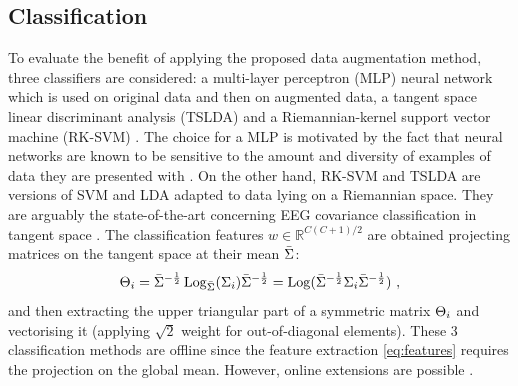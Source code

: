 \subsection{Classification}

To evaluate the benefit of applying the proposed data augmentation method, three classifiers are considered: a multi-layer perceptron (MLP) neural network \citep{duda_pattern_2001} which is used on original data and then on augmented data, a tangent space linear discriminant analysis (TSLDA) \citep{barachant_multiclass_2012} and a Riemannian-kernel support vector machine (RK-SVM) \citep{yger_review_2013}. 
The choice for a MLP is motivated by the fact that neural networks are known to be sensitive to the amount and diversity of examples of data they are presented with \citep{ciresan_multi-column_2012,krizhevsky_imagenet_2012}. 
On the other hand, RK-SVM and TSLDA are versions of SVM and LDA adapted to data lying on a Riemannian space. They are arguably the state-of-the-art concerning EEG covariance classification in tangent space \citep{barachant_multiclass_2012,barachant_classification_2013}.
The classification features $w \in \mathbb{R}^{C(C+1)/2}$ are obtained projecting matrices on the tangent space at their mean $\bar{\P}$:
\begin{equation}
	\label{eq:features}
	\S_i = \bar{\P}^{-\frac{1}{2}} \Log{\bar{\P}}(\P_i) \bar{\P}^{-\frac{1}{2}} = \Logm(\bar{\P}^{-\frac{1}{2}}\P_i \bar{\P}^{-\frac{1}{2}}) \ ,
\end{equation}
and then extracting the upper triangular part of a symmetric matrix $\S_i$ and vectorising it (applying $\sqrt {2}$ weight for out-of-diagonal elements).
These 3 classification methods are offline since the feature extraction \eqref{eq:features} requires the projection on the global mean. However, online extensions are possible \citep{barachant_classification_2013,kalunga_using_2015}.

